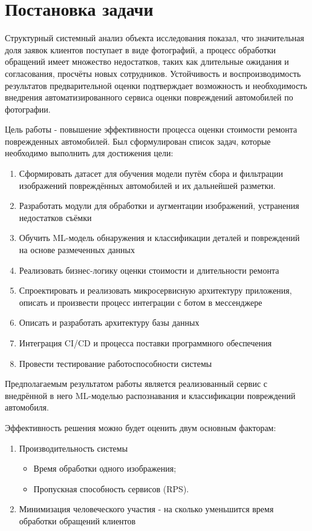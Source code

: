 \chapter{Постановка задачи}\label{ch:4}

Структурный системный анализ объекта исследования показал, что значительная доля заявок клиентов поступает в виде фотографий, а процесс обработки обращений имеет множество недостатков, таких как длительные ожидания и согласования, просчёты новых сотрудников. Устойчивость и воспроизводимость результатов предварительной оценки подтверждает возможность и необходимость внедрения автоматизированного сервиса оценки повреждений автомобилей по фотографии.

Цель работы - повышение эффективности процесса оценки стоимости ремонта поврежденных автомобилей. Был сформулирован список задач, которые необходимо выполнить для достижения цели:

\begin{enumerate}[label=\arabic*.]
    \item Сформировать датасет для обучения модели путём сбора и фильтрации изображений повреждённых автомобилей и их дальнейшей разметки. 
    \item Разработать модули для обработки и аугментации изображений, устранения недостатков съёмки
    \item Обучить ML-модель обнаружения и классификации деталей и повреждений на основе размеченных данных
    \item Реализовать бизнес-логику оценки стоимости и длительности ремонта
    \item Спроектировать и реализовать микросервисную архитектуру приложения, описать и произвести процесс интеграции с ботом в мессенджере
    \item Описать и разработать архитектуру базы данных
    \item Интеграция CI/CD и процесса поставки программного обеспечения
    \item Провести тестирование работоспособности системы
\end{enumerate}

Предполагаемым результатом работы является реализованный сервис с внедрённой в него ML-моделью распознавания и классификации повреждений автомобиля. 

Эффективность решения можно будет оценить двум основным факторам:
\begin{enumerate}[label=\arabic*.]
    \item Производительность системы
    \begin{itemize}
        \item Время обработки одного изображения;
        \item Пропускная способность сервисов (RPS).
    \end{itemize}
    \item Минимизация человеческого участия - на сколько уменьшится время обработки обращений клиентов
\end{enumerate}